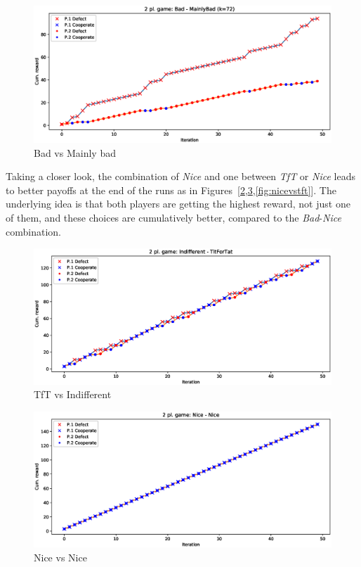 \documentclass[journal,10pt,twoside]{IEEEtran}
\begin{document}
\begin{figure}[!ht]
    \centering
    \includegraphics[width=1\columnwidth]{../img/ipd2p/ipd2p-rewards-Bad-MainlyBad(k=72)}
    \caption{Bad vs Mainly bad}
    \label{fig:badvsmainlybad}
\end{figure}

Taking a closer look, the combination of \textit{Nice} and one between \textit{TfT} or \textit{Nice} leads to better payoffs at the end of the runs as in Figures~[\ref{fig:tftvsindiff},\ref{fig:nicevsnice},\ref{fig:nicevstft}]. The underlying idea is that both players are getting the highest reward, not just one of them, and these choices are cumulatively better, compared to the \textit{Bad}-\textit{Nice} combination.

\begin{figure}[!ht]
    \centering
    \includegraphics[width=1\columnwidth]{../img/ipd2p/ipd2p-rewards-Indifferent-TitForTat}
    \caption{TfT vs Indifferent}
    \label{fig:tftvsindiff}
\end{figure}

\begin{figure}[!ht]
    \centering
    \includegraphics[width=1\columnwidth]{../img/ipd2p/ipd2p-rewards-Nice-Nice}
    \caption{Nice vs Nice}
    \label{fig:nicevsnice}
\end{figure}
\end{document}
